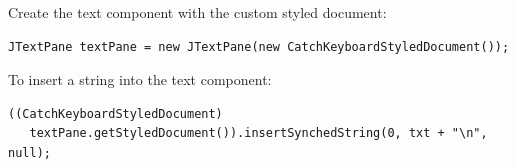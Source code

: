 \documentclass[11pt,a4paper]{article}
\begin{document}
Create the text component with the custom styled document:
\begin{verbatim}
JTextPane textPane = new JTextPane(new CatchKeyboardStyledDocument());
\end{verbatim}

To insert a string into the text component:
\begin{verbatim}
((CatchKeyboardStyledDocument)
   textPane.getStyledDocument()).insertSynchedString(0, txt + "\n", null);
\end{verbatim}



\newpage

\end{document}
